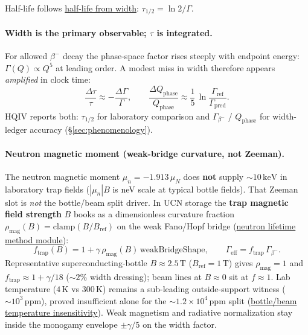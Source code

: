 \documentclass[11pt,notitlepage]{amsart}
\begin{document}
Half-life follows \hyperref[lean:half-life-from-width]{half-life from width}:
$\tau_{1/2}=\ln 2/\Gamma$.

\paragraph{Width is the primary observable; $\tau$ is integrated.}
For allowed $\beta^-$ decay the phase-space factor rises steeply with endpoint energy:
$\Gamma(Q)\propto Q^5$ at leading order. A modest miss in width therefore appears
\emph{amplified} in clock time:
\[
  \frac{\Delta\tau}{\tau}\approx -\frac{\Delta\Gamma}{\Gamma},
  \qquad
  \frac{\Delta Q_{\mathrm{phase}}}{Q_{\mathrm{phase}}}\approx \frac{1}{5}\,
    \ln\!\frac{\Gamma_{\mathrm{ref}}}{\Gamma_{\mathrm{pred}}}.
\]
HQIV reports both: $\tau_{1/2}$ for laboratory comparison and $\Gamma_{\beta^-}$ /
$Q_{\mathrm{phase}}$ for width-ledger accuracy (\S\ref{sec:phenomenology}).

\paragraph{Neutron magnetic moment (weak-bridge curvature, not Zeeman).}
The neutron magnetic moment $\mu_n=-1.913\,\mu_N$ does \textbf{not} supply
$\sim 10\,\mathrm{keV}$ in laboratory trap fields ($|\mu_n|B$ is neV scale at
typical bottle fields). That Zeeman slot is \emph{not} the bottle/beam split driver.
In UCN storage the \textbf{trap magnetic field strength} $B$ books as a dimensionless
curvature fraction $\rho_{\mathrm{mag}}(B)=\mathrm{clamp}(B/B_{\mathrm{ref}})$ on the
weak Fano/Hopf bridge
(\hyperref[lean:neutron-lifetime-method]{neutron lifetime method module}):
\[
  f_{\mathrm{trap}}(B)=1+\gamma\,\rho_{\mathrm{mag}}(B)\,\mathrm{weakBridgeShape},
  \qquad
  \Gamma_{\mathrm{eff}}=f_{\mathrm{trap}}\,\Gamma_{\beta^-}.
\]
Representative superconducting-bottle $B\approx 2.5\,\mathrm{T}$ ($B_{\mathrm{ref}}=1\,\mathrm{T}$)
gives $\rho_{\mathrm{mag}}=1$ and $f_{\mathrm{trap}}\approx 1+\gamma/18$ ($\sim 2\%$ width
dressing); beam lines at $B\approx 0$ sit at $f\approx 1$. Lab temperature ($4\,\mathrm{K}$ vs
$300\,\mathrm{K}$) remains a sub-leading outside-support witness ($\sim 10^3\,\mathrm{ppm}$),
proved insufficient alone for the $\sim 1.2\times 10^4\,\mathrm{ppm}$ split
(\hyperref[lean:neutron-lifetime-method]{bottle/beam temperature insensitivity}).
Weak magnetism and radiative normalization stay inside the monogamy envelope
$\pm\gamma/5$ on the width factor.
\end{document}

